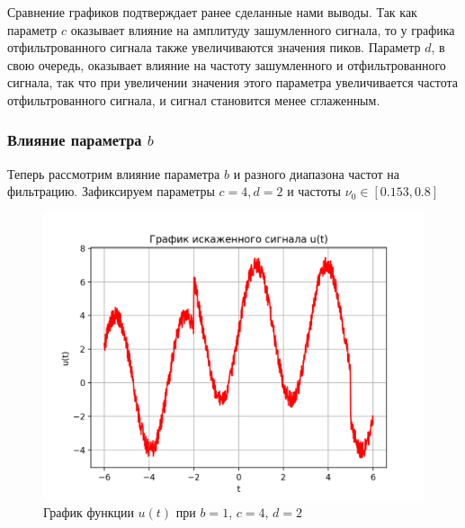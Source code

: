 Сравнение графиков подтверждает ранее сделанные нами выводы. Так как параметр $c$ оказывает влияние на амплитуду зашумленного сигнала, то у графика отфильтрованного сигнала также увеличиваются значения пиков. Параметр $d$, в свою очередь, оказывает влияние на частоту зашумленного и отфильтрованного сигнала, так что при увеличении значения этого параметра увеличивается частота отфильтрованного сигнала, и сигнал становится менее сглаженным.

\subsubsection{Влияние параметра $b$}\label{b_ex}

Теперь рассмотрим влияние параметра $b$  и разного диапазона частот на фильтрацию. Зафиксируем параметры $c=4, d=2$ и частоты  $\nu_0 \in [0.153, 0.8]$

\begin{figure}[ht!]
    \centering
    \includegraphics[scale=0.75]{media/1 task/specific_freq/Noisy_1_4_2.png}
    \caption{График функции $u(t)$ при $b=1$,  $c=4$,  $d=2$}
    \label{fig:noisy_1_4_2}
\end{figure}

